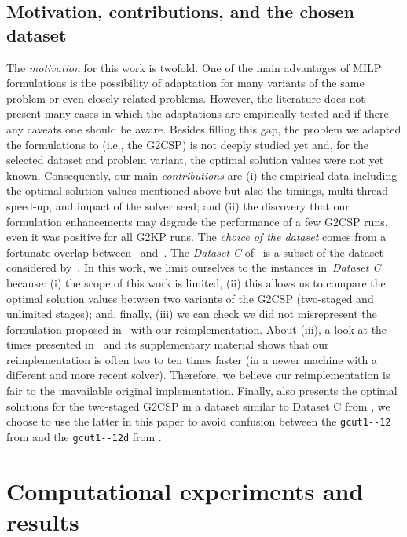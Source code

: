 \documentclass[9pt]{entcs}
\begin{document}
\subsection{Motivation, contributions, and the chosen dataset}

The \emph{motivation} for this work is twofold.
One of the main advantages of MILP formulations is the possibility of adaptation for many variants of the same problem or even closely related problems.
However, the literature does not present many cases in which the adaptations are empirically tested and if there any caveats one should be aware.
Besides filling this gap, the problem we adapted the formulations to (i.e., the G2CSP) is not deeply studied yet and, for the selected dataset and problem variant, the optimal solution values were not yet known.
Consequently, our main \emph{contributions} are (i) the empirical data including the optimal solution values mentioned above but also the timings, multi-thread speed-up, and impact of the solver seed; and (ii) the discovery that our formulation enhancements may degrade the performance of a few G2CSP runs, even it was positive for all G2KP runs.
The \emph{choice of the dataset} comes from a fortunate overlap between~\cite{furini:2016} and~\cite{silva:2010}.
The \emph{Dataset C} of~\cite{silva:2010} is a subset of the dataset considered by~\cite{furini:2016}.
In this work, we limit ourselves to the instances in~\emph{Dataset C} because: (i) the scope of this work is limited, (ii) this allows us to compare the optimal solution values between two variants of the G2CSP (two-staged and unlimited stages); and, finally, (iii) we can check we did not misrepresent the formulation proposed in~\cite{furini:2016} with our reimplementation.
About (iii), a look at the times presented in~\cite{furini:2016} and its supplementary material shows that our reimplementation is often two to ten times faster (in a newer machine with a different and more recent solver).
Therefore, we believe our reimplementation is fair to the unavailable original implementation.
Finally, \cite{furini:2013} also presents the optimal solutions for the two-staged G2CSP in a dataset similar to Dataset C from \cite{silva:2010}, we choose to use the latter in this paper to avoid confusion between the \verb+gcut1--12+ from \cite{furini:2016} and the \verb+gcut1--12d+ from \cite{furini:2013}.

\section{Computational experiments and results}
\end{document}
